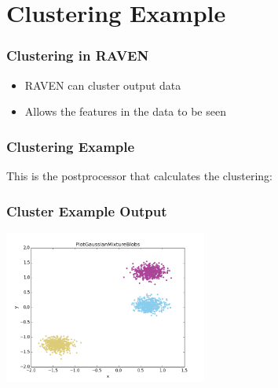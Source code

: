 \documentclass[t,9pt,svgnames]{beamer}
\begin{document}
\section{Clustering Example}

\begin{frame}
  \frametitle{Clustering in RAVEN}
  \begin{itemize}
  \item RAVEN can cluster output data
  \item Allows the features in the data to be seen
  \end{itemize}
\end{frame}

\begin{frame}[fragile]
  \frametitle{Clustering Example}
  This is the postprocessor that calculates the clustering:
  

\end{frame}

\begin{frame}
  \frametitle{Cluster Example Output}
  \includegraphics[height=5cm]{images/PlotGaussianMixture.png}
\end{frame}
\end{document}
